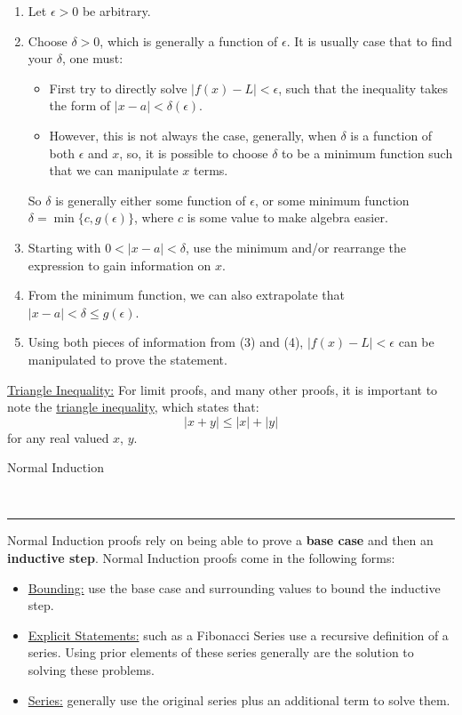 \documentclass{article}
\newcommand{\header}[1]{\begin{large}\noindent #1\end{large}\\\rule{\textwidth}{0.5pt}}
\newcommand{\gap}{\medskip\\}
\newcommand{\sheader}[1]{\underline{#1:}}
\begin{document}
\begin{enumerate}
    \item Let $\epsilon > 0$ be arbitrary.
    \item Choose $\delta > 0$, which is generally a function of $\epsilon$. It is 
    usually case that to find your $\delta$, one must:
    \begin{itemize}
        \item First try to directly solve $|f(x) - L|< \epsilon$, such that the inequality
        takes the form of $|x - a| < \delta(\epsilon)$. 
        \item However, this is not always the case, generally, when $\delta$ is a function of both 
        $\epsilon$ and $x$, so, it is possible to choose $\delta$ to be a minimum function 
        such that we can manipulate $x$ terms.
    \end{itemize}
    So $\delta$ is generally either some function of $\epsilon$, or some minimum function
    $\delta = \min\{c, g(\epsilon)\}$, where $c$ is some value to make algebra easier.
    \item Starting with $0 < |x - a| < \delta$, use the minimum and/or rearrange the 
    expression to gain information on $x$.
    \item From the minimum function, we can also extrapolate that $|x - a| < \delta \leq g(\epsilon)$.
    \item Using both pieces of information from (3) and (4), $|f(x) - L| < \epsilon$ can be manipulated
    to prove the statement.
\end{enumerate}
\sheader{Triangle Inequality} For limit proofs, and many other proofs, it is important
to note the \underline{triangle inequality}, which states that:
\[
    |x + y| \leq |x| + |y|
\] 
for any real valued $x$, $y$.
\gap
\header{Normal Induction}
Normal Induction proofs rely on being able to prove a \textbf{base case} and then an \textbf{inductive step}.
Normal Induction proofs come in the following forms:
\begin{itemize}
    \item \sheader{Bounding} use the base case and surrounding values to bound the inductive step.
    \item \sheader{Explicit Statements} such as a Fibonacci Series use a recursive definition of a 
    series. Using prior elements of these series generally are the solution to solving these problems.
    \item \sheader{Series} generally use the original series plus an additional term to solve them.
\end{itemize}
\end{document}
